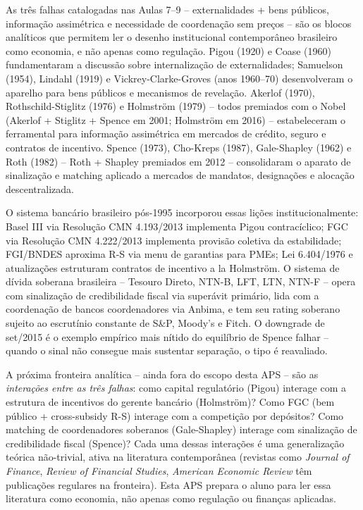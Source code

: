 \documentclass[11pt,addpoints]{exam}
\begin{document}
\vspace{1em}
\begin{contextbox}
\small
As três falhas catalogadas nas Aulas 7--9 -- externalidades + bens públicos, informação assimétrica e necessidade de coordenação sem preços -- são os blocos analíticos que permitem ler o desenho institucional contemporâneo brasileiro como economia, e não apenas como regulação. Pigou (1920) e Coase (1960) fundamentaram a discussão sobre internalização de externalidades; Samuelson (1954), Lindahl (1919) e Vickrey-Clarke-Groves (anos 1960--70) desenvolveram o aparelho para bens públicos e mecanismos de revelação. Akerlof (1970), Rothschild-Stiglitz (1976) e Holmström (1979) -- todos premiados com o Nobel (Akerlof + Stiglitz + Spence em 2001; Holmström em 2016) -- estabeleceram o ferramental para informação assimétrica em mercados de crédito, seguro e contratos de incentivo. Spence (1973), Cho-Kreps (1987), Gale-Shapley (1962) e Roth (1982) -- Roth + Shapley premiados em 2012 -- consolidaram o aparato de sinalização e matching aplicado a mercados de mandatos, designações e alocação descentralizada.

O sistema bancário brasileiro pós-1995 incorporou essas lições institucionalmente: Basel III via Resolução CMN 4.193/2013 implementa Pigou contracíclico; FGC via Resolução CMN 4.222/2013 implementa provisão coletiva da estabilidade; FGI/BNDES aproxima R-S via menu de garantias para PMEs; Lei 6.404/1976 e atualizações estruturam contratos de incentivo a la Holmström. O sistema de dívida soberana brasileira -- Tesouro Direto, NTN-B, LFT, LTN, NTN-F -- opera com sinalização de credibilidade fiscal via superávit primário, lida com a coordenação de bancos coordenadores via Anbima, e tem seu rating soberano sujeito ao escrutínio constante de S\&P, Moody's e Fitch. O downgrade de set/2015 é o exemplo empírico mais nítido do equilíbrio de Spence falhar -- quando o sinal não consegue mais sustentar separação, o tipo é reavaliado.

A próxima fronteira analítica -- ainda fora do escopo desta APS -- são as \emph{interações entre as três falhas}: como capital regulatório (Pigou) interage com a estrutura de incentivos do gerente bancário (Holmström)? Como FGC (bem público + cross-subsidy R-S) interage com a competição por depósitos? Como matching de coordenadores soberanos (Gale-Shapley) interage com sinalização de credibilidade fiscal (Spence)? Cada uma dessas interações é uma generalização teórica não-trivial, ativa na literatura contemporânea (revistas como \emph{Journal of Finance}, \emph{Review of Financial Studies}, \emph{American Economic Review} têm publicações regulares na fronteira). Esta APS prepara o aluno para ler essa literatura como economia, não apenas como regulação ou finanças aplicadas.
\end{contextbox}
\end{document}
